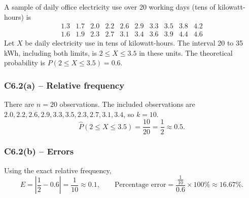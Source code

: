 {
A sample of daily office electricity use over 20 working days (tens of kilowatt-hours) is
\[
\begin{array}{cccccccccc}
1.3&1.7&2.0&2.2&2.6&2.9&3.3&3.5&3.8&4.2\\
1.6&1.9&2.3&2.7&3.1&3.4&3.6&3.9&4.4&4.6
\end{array}
\]
Let $X$ be daily electricity use in tens of kilowatt-hours. The interval
20 to 35 kWh, including both limits, is $2\le X\le3.5$ in these units.
The theoretical probability is $P(2\le X\le3.5)=0.6$.
\label{sol:c6-2a}
\subsubsection*{C6.2(a) -- Relative frequency }
There are $n=20$ observations. The included observations are
$2.0,2.2,2.6,2.9,3.3,3.5,2.3,2.7,3.1,3.4$, so $k=10$.
\[
\widehat P(2\le X\le3.5)=\frac{10}{20}=\frac{1}{2}\approx0.5.
\]
\label{sol:c6-2b}
\subsubsection*{C6.2(b) -- Errors }
Using the exact relative frequency,
\[
E=\left|\frac{1}{2}-0.6\right|=\frac{1}{10}\approx0.1,\qquad
\text{Percentage error}=\frac{\frac{1}{10}}{0.6}\times100\%\approx16.67\%.
\]
\secInicio[sec:c6-2]

}

